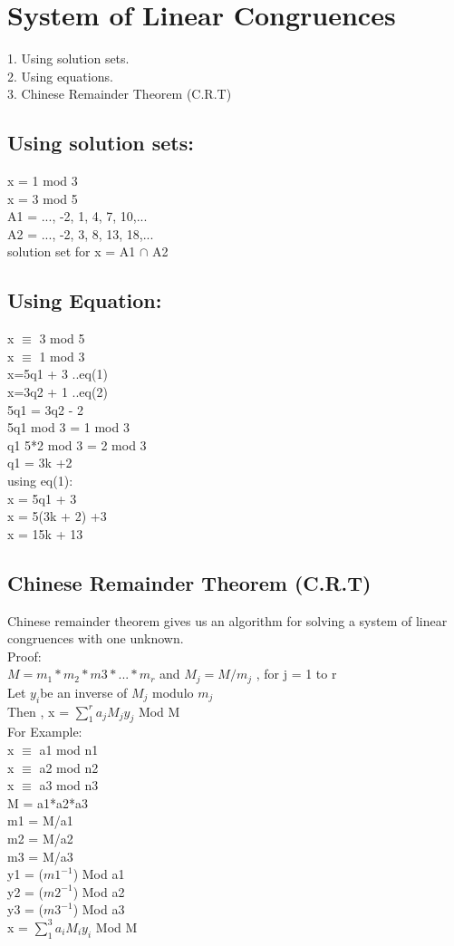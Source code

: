 \documentclass{article}
\begin{document}
\section{System of Linear Congruences}
1. Using solution sets.\\
2. Using equations. \\
3. Chinese Remainder Theorem (C.R.T)
\subsection{Using solution sets:}
x = 1 mod 3 \\
x = 3 mod 5 \\
A1 = {..., -2, 1, 4, 7, 10,...} \\
A2 = {..., -2, 3, 8, 13, 18,...} \\
solution set for x = A1 $\cap$ A2
\subsection{Using Equation:}
x $\equiv$ 3 mod 5   \\
x $\equiv$ 1 mod 3   \\
x=5q1 + 3   ..eq(1)   \\
x=3q2 + 1   ..eq(2)   \\
5q1 = 3q2  - 2   \\
5q1 mod 3 = 1 mod 3   \\
q1 5*2 mod 3 = 2 mod 3   \\
q1 = 3k +2   \\
using eq(1):   \\
x = 5q1 + 3   \\
x = 5(3k + 2) +3   \\
x = 15k + 13
\subsection{Chinese Remainder Theorem (C.R.T)}
Chinese remainder theorem gives us an algorithm for solving a system of linear congruences with one unknown. \\
Proof:\\
$M=m_1*m_2*m3*...*m_r$  and  $M_j=M/m_j$ , for j = 1 to r \\
Let $y_i$be an inverse of $M_j$ modulo $m_j$ \\
Then , x = $\sum_{1}^{r} a_j M_j y_j$ Mod M \\
For Example: \\
x $\equiv$ a1 mod n1 \\
x $\equiv$ a2 mod n2 \\
x $\equiv$ a3 mod n3 \\
M = a1*a2*a3 \\
m1 = M/a1 \\
m2 = M/a2 \\
m3 = M/a3 \\
y1 = ($m1^{-1}$) Mod a1 \\
y2 = ($m2^{-1}$) Mod a2 \\
y3 = ($m3^{-1}$) Mod a3 \\
x = $\sum_{1}^{3} a_i M_i y_i$ Mod M 
\end{document}
